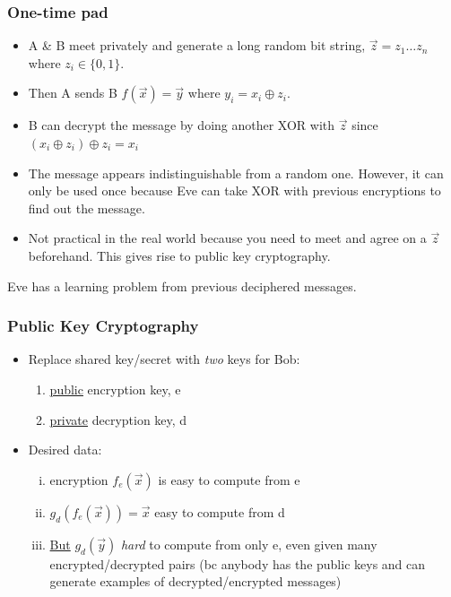 \documentclass[12pt, letterpaper]{article}
\numberwithin{equation}{section} %
\newcommand{\ul}{\underline}
\theoremstyle{definition}
\theoremstyle{remark}
\begin{document}
\subsubsection*{One-time pad}
\begin{itemize}
\item A \& B meet privately and generate a long random bit string, $\vec z = z_1\ldots z_n$ where $z_i\in \lbrace 0,1 \rbrace$.
\item Then A sends B $f(\vec x) = \vec y$ where $y_i = x_i \oplus z_i$.
\item B can decrypt the message by doing another XOR with $\vec z$ since $(x_i \oplus z_i)\oplus z_i = x_i$
\item The message appears indistinguishable from a random one. However, it can only be used once because Eve can take XOR with previous encryptions to find out the message.
\item Not practical in the real world because you need to meet and agree on a $\vec z$ beforehand. This gives rise to public key cryptography.
\end{itemize}
Eve has a learning problem from previous deciphered messages.

\subsubsection*{Public Key Cryptography}
\begin{itemize}
\item Replace shared key/secret with \emph{two} keys for Bob:
    \begin{enumerate}
    \item \ul{public} encryption key, e
    \item \ul{private} decryption key, d
    \end{enumerate}
\item Desired data:
    \begin{enumerate}[i)]
    \item encryption $f_e(\vec x)$ is easy to compute from e
    \item $g_d(f_e(\vec x)) =\vec x$ easy to compute from d
    \item \ul{But} $g_d(\vec y)$ \emph{hard} to compute from only e, even given many encrypted/decrypted pairs (bc anybody has the public keys and can generate examples of decrypted/encrypted messages)
    \end{enumerate}
\end{itemize}
\end{document}
